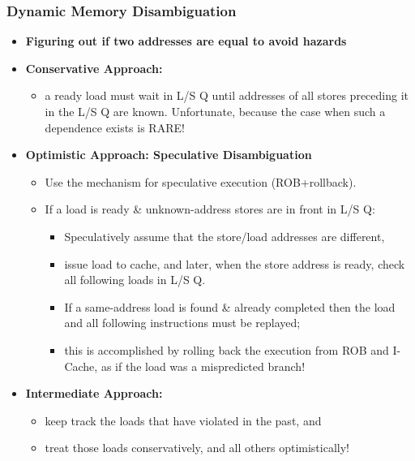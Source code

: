 \documentclass{beamer}
\newcommand{\emp}[1]{\textcolor{DikuRed}{ #1}}
\begin{document}
\begin{frame}[fragile,t]
\frametitle{Dynamic Memory Disambiguation}

\begin{itemize}
\item \emp{\bf Figuring out if two addresses are equal to avoid hazards}\medskip

\item \emp{\bf Conservative Approach:}
\begin{itemize}
    \item a ready load must wait in L/S Q until addresses of all stores preceding it
        in the L/S Q are known.  \alert{Unfortunate}, because the case when such
            a dependence exists is RARE!
\end{itemize}\medskip

\item \emp{\bf Optimistic Approach: Speculative Disambiguation}
\begin{itemize}
    \item Use the mechanism for speculative execution (ROB+rollback).
    \item If a load is ready \& unknown-address stores are in front in L/S Q:
    \begin{itemize}
        \item Speculatively assume that the store/load addresses are different, 
        \item issue load to cache, and later, when the store address is ready,
                 check all following loads in L/S Q.
        \item If a same-address load is found \& already completed then the load
                and all following instructions must be replayed; 
        \item this is accomplished by rolling back the execution from ROB and I-Cache,
                \emp{as if the load was a mispredicted branch!}
    \end{itemize}
\end{itemize}\medskip

\item \emp{\bf Intermediate Approach:}
\begin{itemize}
    \item keep track the loads that have violated in the past, and
    \item treat those loads conservatively, and all others optimistically! 
\end{itemize}
\end{itemize}

\end{frame}
\end{document}
